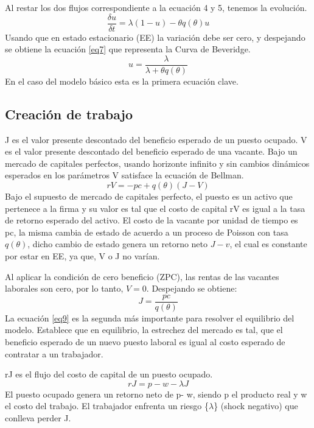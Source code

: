 \documentclass[12pt,oneside]{reedthesis}
\begin{document}
Al restar los dos flujos correspondiente a la ecuación 4 y 5, tenemos la evolución.
\begin{equation} \label{eq6}
\frac{\delta u}{\delta t} = \lambda(1-u)-\theta q(\theta)u
\end{equation}
Usando que en estado estacionario (EE) la variación debe ser cero, y despejando se obtiene la ecuación \eqref{eq7} que representa la Curva de Beveridge.
\begin{equation} \label{eq7}
u = \frac{\lambda}{\lambda+\theta q(\theta)}
\end{equation}
En el caso del modelo básico esta es la primera ecuación clave.

\subsection{Creación de trabajo}

J es el valor presente descontado del beneficio esperado de un puesto ocupado. V es el valor presente descontado del beneficio esperado de una vacante. Bajo un mercado de capitales perfectos, usando horizonte infinito y sin cambios dinámicos esperados en los parámetros V satisface la ecuación de Bellman.
\begin{equation} \label{eq8}
rV = - pc + q(\theta)(J-V)
\end{equation}
Bajo el supuesto de mercado de capitales perfecto, el puesto es un activo que pertenece a la firma y su valor es tal que el costo de capital rV es igual a la tasa de retorno esperado del activo. El costo de la vacante por unidad de tiempo es pc, la misma cambia de estado de acuerdo a un proceso de Poisson con tasa \(q(\theta)\), dicho cambio de estado genera un retorno neto \(J-v\), el cual es constante por estar en EE, ya que, V o J no varían.

Al aplicar la condición de cero beneficio (ZPC), las rentas de las vacantes laborales son cero, por lo tanto, \(V=0\). Despejando se obtiene:
\begin{equation} \label{eq9}
J = \frac{pc}{q(\theta)}
\end{equation}
La ecuación \eqref{eq9} es la segunda más importante para resolver el equilibrio del modelo. Establece que en equilibrio, la estrechez del mercado es tal, que el beneficio esperado de un nuevo puesto laboral es igual al costo esperado de contratar a un trabajador.

rJ es el flujo del costo de capital de un puesto ocupado.
\begin{equation} \label{eq10}
rJ = p - w - \lambda J
\end{equation}
El puesto ocupado genera un retorno neto de p- w, siendo p el producto real y w el costo del trabajo. El trabajador enfrenta un riesgo \{\(\lambda\)\} (shock negativo) que conlleva perder J.
\end{document}
